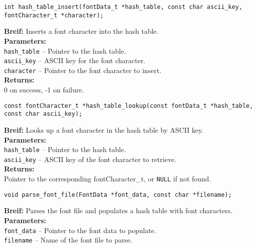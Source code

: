 
    

    \begin{verbatim}
int hash_table_insert(fontData_t *hash_table, const char ascii_key, fontCharacter_t *character);
        \end{verbatim}
        \textbf{Breif:} Inserts a font character into the hash table. \\
        \textbf{Parameters:} \\
        \hspace*{1cm}\texttt{hash\_table} -- Pointer to the hash table. \\
        \hspace*{1cm}\texttt{ascii\_key} -- ASCII key for the font character. \\
        \hspace*{1cm}\texttt{character} -- Pointer to the font character to insert. \\
        \textbf{Returns:} \\
        \hspace*{1cm}0 on success, -1 on failure. \\[1em]
        
        \begin{verbatim}
const fontCharacter_t *hash_table_lookup(const fontData_t *hash_table, const char ascii_key);
        \end{verbatim}
        \textbf{Breif:} Looks up a font character in the hash table by ASCII key. \\
        \textbf{Parameters:} \\
        \hspace*{1cm}\texttt{hash\_table} -- Pointer to the hash table. \\
        \hspace*{1cm}\texttt{ascii\_key} -- ASCII key of the font character to retrieve. \\
        \textbf{Returns:} \\
        \hspace*{1cm}Pointer to the corresponding fontCharacter\_t, or \texttt{NULL} if not found. \\[1em]
        
        \begin{verbatim}
void parse_font_file(FontData *font_data, const char *filename);
        \end{verbatim}
        \textbf{Breif:} Parses the font file and populates a hash table with font characters. \\
        \textbf{Parameters:} \\
        \hspace*{1cm}\texttt{font\_data} -- Pointer to the font data to populate. \\
        \hspace*{1cm}\texttt{filename} -- Name of the font file to parse. \\
        
